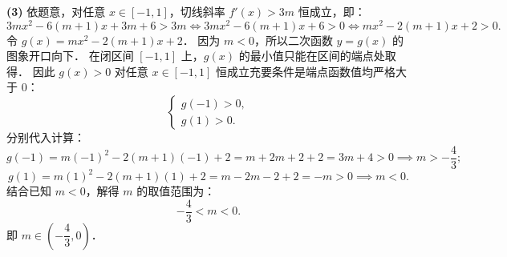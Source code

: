 \begin{answer}
\textbf{(3)}
依题意，对任意 $x \in [-1, 1]$，切线斜率 $f'(x) > 3m$ 恒成立，即：
\nopagebreak[4]
\[
3mx^2 - 6(m+1)x + 3m + 6 > 3m \iff 3mx^2 - 6(m+1)x + 6 > 0 \iff mx^2 - 2(m+1)x + 2 > 0.
\]
令 $g(x) = mx^2 - 2(m+1)x + 2$．
因为 $m < 0$，所以二次函数 $y = g(x)$ 的图象开口向下．
在闭区间 $[-1, 1]$ 上，$g(x)$ 的最小值只能在区间的端点处取得．
因此 $g(x) > 0$ 对任意 $x \in [-1, 1]$ 恒成立充要条件是端点函数值均严格大于 $0$：
\nopagebreak[4]
\[
\begin{cases} g(-1) > 0, \\ g(1) > 0. \end{cases}
\]
分别代入计算：
\nopagebreak[4]
\[
g(-1) = m(-1)^2 - 2(m+1)(-1) + 2 = m + 2m + 2 + 2 = 3m + 4 > 0 \implies m > -\dfrac{4}{3};
\]
\nopagebreak[4]
\[
g(1) = m(1)^2 - 2(m+1)(1) + 2 = m - 2m - 2 + 2 = -m > 0 \implies m < 0.
\]
结合已知 $m < 0$，解得 $m$ 的取值范围为：
\nopagebreak[4]
\[
-\dfrac{4}{3} < m < 0.
\]
即 $m \in \left(-\dfrac{4}{3}, 0\right)$．




\end{answer}
